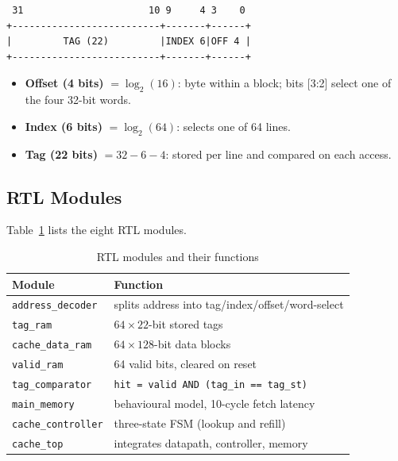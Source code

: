 \documentclass[conference]{IEEEtran}
\begin{document}
\begin{verbatim}
 31                      10 9     4 3    0
+--------------------------+-------+------+
|         TAG (22)         |INDEX 6|OFF 4 |
+--------------------------+-------+------+
\end{verbatim}

\begin{itemize}
  \item \textbf{Offset (4 bits)} $=\log_2(16)$: byte within a block; bits [3:2]
        select one of the four 32-bit words.
  \item \textbf{Index (6 bits)} $=\log_2(64)$: selects one of 64 lines.
  \item \textbf{Tag (22 bits)} $= 32-6-4$: stored per line and compared on each
        access.
\end{itemize}

\subsection{RTL Modules}
Table~\ref{tab:modules} lists the eight RTL modules.

\begin{table}[htbp]
\caption{RTL modules and their functions}
\label{tab:modules}
\centering
\begin{tabular}{@{}ll@{}}
\toprule
\textbf{Module} & \textbf{Function} \\
\midrule
\texttt{address\_decoder}  & splits address into tag/index/offset/word-select \\
\texttt{tag\_ram}          & $64 \times 22$-bit stored tags \\
\texttt{cache\_data\_ram}  & $64 \times 128$-bit data blocks \\
\texttt{valid\_ram}        & 64 valid bits, cleared on reset \\
\texttt{tag\_comparator}   & \texttt{hit = valid AND (tag\_in == tag\_st)} \\
\texttt{main\_memory}      & behavioural model, 10-cycle fetch latency \\
\texttt{cache\_controller} & three-state FSM (lookup and refill) \\
\texttt{cache\_top}        & integrates datapath, controller, memory \\
\bottomrule
\end{tabular}
\end{table}
\end{document}
